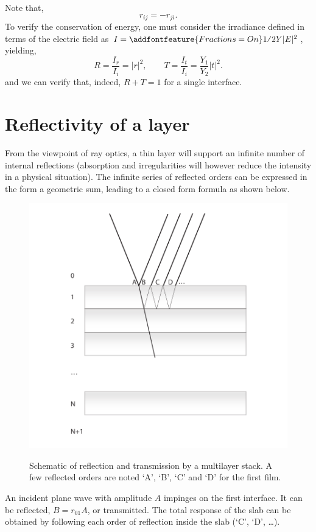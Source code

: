 \documentclass[a4paper,11pt]{article}
\begin{document}
Note that,
\begin{equation}
	r_{ij}=-r_{ji}.
\label{eq:t}
\end{equation}
To verify the conservation of energy, one must consider the irradiance defined in terms of the electric field as $I=\addfontfeature{Fractions=On}\text{1⁄2}Y|E|^2$, yielding,
\begin{equation}
	R=\frac{I_r}{I_i}=|r|^2, \qquad T=\frac{I_t}{I_i}=\frac{Y_1}{Y_2}|t|^2.
\label{eq:irradiance}
\end{equation}
and we can verify that, indeed, $R+T=1$ for a single interface.

\section{Reflectivity of a layer} %
\label{sec:two_interfaces}
% 
From the viewpoint of ray optics, a thin layer will support an infinite number of internal reflections (absorption and irregularities will however reduce the intensity in a physical situation). The infinite series of reflected orders can be expressed in the form a geometric sum, leading to a closed form formula as shown below.
	\begin{figure}[!ht]
	\centering	\includegraphics{stack}
	\label{fig:fresnel}
	\caption[Schematic of reflection and transmission by a multilayer stack.]{Schematic of reflection and transmission by a multilayer stack. A few reflected orders are noted `A', `B', `C' and `D' for the first film.}
	\end{figure}
An incident plane wave with amplitude $A$ impinges on the first interface. It can be reflected, $B=r_{01}A$, or transmitted. The total response of the slab can be obtained by following each order of reflection inside the slab (`C', `D', \dots).
\end{document}
